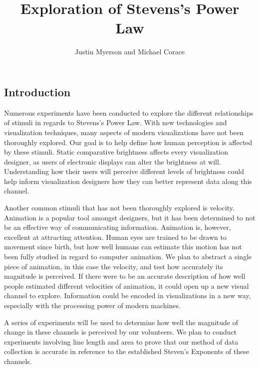 \documentclass{article}
\title{Exploration of Stevens’s Power Law}
\author{Justin Myerson and Michael Corace}
\begin{document}
\maketitle

\begin{multicols}{2}

\section{Introduction}
Numerous experiments have been conducted to explore the different relationships of stimuli in regards to Stevens’s Power Law. With new technologies and visualization techniques, many aspects of modern visualizations have not been thoroughly explored. Our goal is to help define how human perception is affected by these stimuli. Static comparative brightness affects every visualization designer, as users of electronic displays can alter the brightness at will. Understanding how their users will perceive different levels of brightness could help inform visualization designers how they can better represent data along this channel. \citep{bauer2009does}\citep{heer2010crowdsourcing}\citep{rensink2000seeing}\par

Another common stimuli that has not been thoroughly explored is velocity. Animation is a popular tool amongst designers, but it has been determined to not be an effective way of communicating information. \cite{chevalier2014not}\cite{robertson2008effectiveness} Animation is, however, excellent at attracting attention. Human eyes are trained to be drawn to movement since birth, but how well humans can estimate this motion has not been fully studied in regard to computer animation. \cite{rensink2002change} We plan to abstract a single piece of animation, in this case the velocity, and test how accurately its magnitude is perceived. If there were to be an accurate description of how well people estimated different velocities of animation, it could open up a new visual channel to explore. Information could be encoded in visualizations in a new way, especially with the processing power of modern machines.\par 

A series of experiments will be used to determine how well the magnitude of change in these channels is perceived by our volunteers. We plan to conduct experiments involving line length and area to prove that our method of data collection is accurate in reference to the established Steven’s Exponents of these channels.


\end{multicols}
\end{document}
